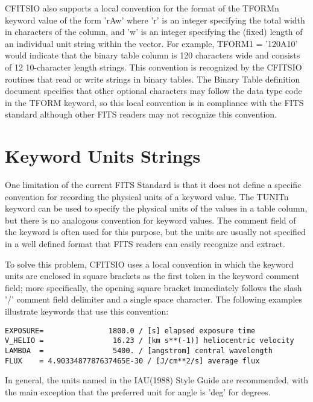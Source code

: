 \documentclass[11pt]{book}
\begin{document}
CFITSIO also supports a
local convention for the format of the TFORMn keyword value of the form
'rAw' where 'r' is an integer specifying the total width in characters
of the column, and 'w' is an integer specifying the (fixed) length of
an individual unit string within the vector.  For example, TFORM1 =
'120A10' would indicate that the binary table column is 120 characters
wide and consists of 12 10-character length strings.  This convention
is recognized by the CFITSIO routines that read or write strings in
binary tables.   The Binary Table definition document specifies that
other optional characters may follow the data type code in the TFORM
keyword, so this local convention is in compliance with the
FITS standard although other FITS readers may not
recognize this convention.



\section{Keyword Units Strings}

One limitation of the current FITS Standard is that it does not define
a specific convention for recording the physical units of a keyword
value.  The TUNITn keyword can be used to specify the physical units of
the values in a table column, but there is no analogous convention for
keyword values.  The comment field of the keyword is often used for
this purpose, but the units are usually not specified in a well defined
format that FITS readers can easily recognize and extract.

To solve this problem, CFITSIO uses a local convention in which the
keyword units are enclosed in square brackets as the first token in the
keyword comment field; more specifically, the opening square bracket
immediately follows the slash '/' comment field delimiter and a single
space character.  The following examples illustrate keywords that use
this convention:


\begin{verbatim}
EXPOSURE=               1800.0 / [s] elapsed exposure time
V_HELIO =                16.23 / [km s**(-1)] heliocentric velocity
LAMBDA  =                5400. / [angstrom] central wavelength
FLUX    = 4.9033487787637465E-30 / [J/cm**2/s] average flux
\end{verbatim}

In general, the units named in the IAU(1988) Style Guide are
recommended, with the main exception that the preferred unit for angle
is 'deg' for degrees.
\end{document}
